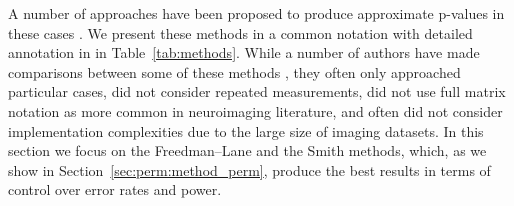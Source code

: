 A number of approaches have been proposed to produce approximate p-values in these cases \citep{Draper1966, Beaton1978, Still1981, Brown1982, Levin1983, Freedman1983, Oja1987, Gail1988, Welch1990, TerBraak1992, Kennedy1995, Edgington1995, Huh2001, Jung2006, Manly2007, Kherad2010}. We present these methods in a common notation with detailed annotation in in Table~\ref{tab:methods}.  While a number of authors have made comparisons between some of these methods \citep{Kennedy1995, Kennedy1996, Gonzalez1998, Anderson1999, Anderson2001, Anderson2003, OGorman2005, Dekker2007, Nichols2008, Ridgway2009}, they often only approached particular cases, did not consider repeated measurements, did not use full matrix notation as more common in neuroimaging literature, and often did not consider implementation complexities due to the large size of imaging datasets. In this section we focus on the Freedman--Lane and the Smith methods, which, as we show in Section~\ref{sec:perm:method_perm}, produce the best results in terms of control over error rates and power.


